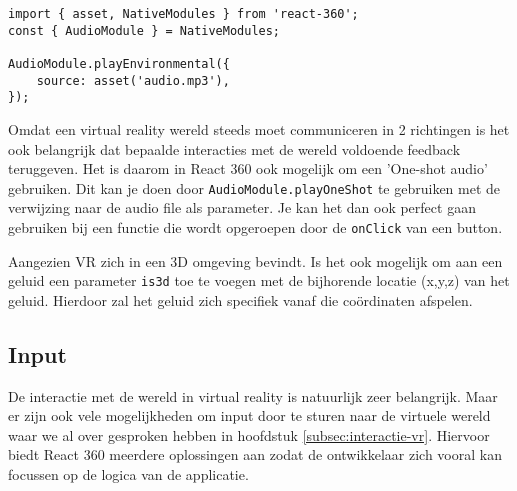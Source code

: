 \begin{lstlisting}[frame=single, caption=Voorbeeld van een Entity component]
import { asset, NativeModules } from 'react-360';
const { AudioModule } = NativeModules;

AudioModule.playEnvironmental({
	source: asset('audio.mp3'),
});
\end{lstlisting}

Omdat een virtual reality wereld steeds moet communiceren in 2 richtingen is het ook belangrijk dat bepaalde interacties met de wereld voldoende feedback teruggeven. Het is daarom in React 360 ook mogelijk om een 'One-shot audio' gebruiken. Dit kan je doen door \lstinline[basicstyle=\ttfamily\color{red}]|AudioModule.playOneShot| te gebruiken met de verwijzing naar de audio file als parameter. Je kan het dan ook perfect gaan gebruiken bij een functie die wordt opgeroepen door de \lstinline[basicstyle=\ttfamily\color{red}]|onClick| van een button.

Aangezien VR zich in een 3D omgeving bevindt. Is het ook mogelijk om aan een geluid een parameter \lstinline[basicstyle=\ttfamily\color{red}]|is3d| toe te voegen met de bijhorende locatie (x,y,z) van het geluid. Hierdoor zal het geluid zich specifiek vanaf die coördinaten afspelen.


\subsection{Input}
\label{subsec:input-vr}
De interactie met de wereld in virtual reality is natuurlijk zeer belangrijk. Maar er zijn ook vele mogelijkheden om input door te sturen naar de virtuele wereld waar we al over gesproken hebben in hoofdstuk \ref{subsec:interactie-vr}. Hiervoor biedt React 360 meerdere oplossingen aan zodat de ontwikkelaar zich vooral kan focussen op de logica van de applicatie.

